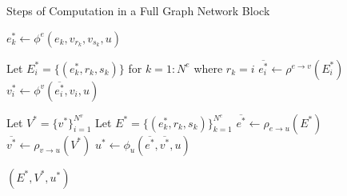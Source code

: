 \begin{algorithm}
    \caption{Steps of Computation in a Full Graph Network Block \cite{graphInductiveBias}}
    \label{algo:graph_network}

    \begin{algorithmic}[1]
            \State $e^*_k \gets \phi^e(e_k, v_{r_k}, v_{s_k}, u)$
        \EndFor

            \State Let $E_i^* = \{(e^*_k, r_k, s_k)\}$ for $k = 1 : N^e$ where $r_k = i$
            \State $\overline{e^*_i} \gets \rho^{e \to v}(E^*_i)$
            \State $v^*_i \gets \phi^v(\overline{e^*_i}, v_i, u)$
        \EndFor

        \State Let $V^* = \{v^*\}_{i=1}^{N^v}$
        \State Let $E^* = \{(e^*_k, r_k, s_k)\}_{k=1}^{N^e}$
        \State $\overline{e^*} \gets \rho_{e \to u}(E^*)$
        \State $\overline{v^*} \gets \rho_{v \to u}(V^*)$
        \State $u^* \gets \phi_u(\overline{e^*}, \overline{v^*}, u)$

        \State \Return $(E^*, V^*, u^*)$
    \EndFunction
    \end{algorithmic}
\end{algorithm}

